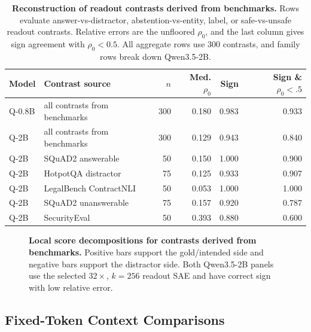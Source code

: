 \begin{table}[!tbp]
\caption{\textbf{Reconstruction of readout contrasts derived from benchmarks.}
Rows evaluate answer-vs-distractor, abstention-vs-entity, label, or
safe-vs-unsafe readout contrasts. Relative errors are the unfloored
\(\rho_0\), and the last column gives sign agreement with \(\rho_0<0.5\).
All aggregate rows use 300 contrasts, and family rows break down Qwen3.5-2B.}
\label{tab:benchmark-derived-readout-contrasts}
\centering
\scriptsize
\setlength{\tabcolsep}{3.0pt}
\renewcommand{\arraystretch}{1.05}
\begin{tabular}{@{}llrrrr@{}}
\toprule
Model & Contrast source & \(n\) & Med. \(\rho_0\) & Sign & \makecell{Sign \&\\ \(\rho_0<.5\)} \\
\midrule
Q-0.8B & all contrasts from benchmarks & 300 & 0.180 & 0.983 & 0.933 \\
Q-2B & all contrasts from benchmarks & 300 & 0.129 & 0.943 & 0.840 \\
\addlinespace[1pt]
Q-2B & SQuAD2 answerable & 50 & 0.150 & 1.000 & 0.900 \\
Q-2B & HotpotQA distractor & 75 & 0.125 & 0.933 & 0.907 \\
Q-2B & LegalBench ContractNLI & 50 & 0.053 & 1.000 & 1.000 \\
Q-2B & SQuAD2 unanswerable & 75 & 0.157 & 0.920 & 0.787 \\
Q-2B & SecurityEval & 50 & 0.393 & 0.880 & 0.600 \\
\bottomrule
\end{tabular}
\end{table}

\begin{figure}[!tbp]
    \centering
    \caption{\textbf{Local score decompositions for contrasts derived from benchmarks.}
    Positive bars support the gold/intended side and negative bars support the
    distractor side. Both Qwen3.5-2B panels use the selected \(32\times\),
    \(k=256\) readout SAE and have correct sign with low relative error.}
    \label{fig:app-benchmark-task-group-examples}
\end{figure}

\subsection{Fixed-Token Context Comparisons}
\label{app:same-token-context-splits}

